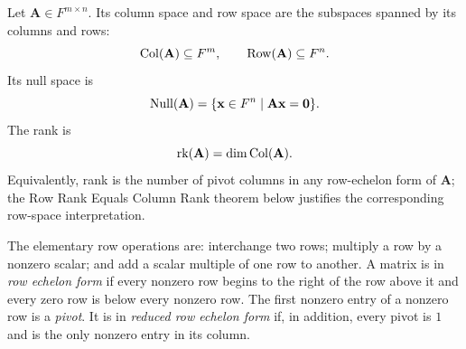     \begin{definition}
        Let $\mathbf{A}\in F^{m\times n}$. Its column space and row space are
        the subspaces spanned by its columns and rows:
        \[
            \operatorname{Col}(\mathbf{A})\subseteq F^m,
            \qquad
            \operatorname{Row}(\mathbf{A})\subseteq F^n.
        \]
        Its null space is
        \[
            \operatorname{Null}(\mathbf{A})
            =
            \{\mathbf{x}\in F^n\mid \mathbf{A}\mathbf{x}=\mathbf{0}\}.
        \]
        The rank is
        \[
            \operatorname{rk}(\mathbf{A})=\dim\operatorname{Col}(\mathbf{A}).
        \]
        Equivalently, rank is the number of pivot columns in any row-echelon
        form of $\mathbf{A}$; the Row Rank Equals Column Rank theorem below
        justifies the corresponding row-space interpretation.
    \end{definition}

    \begin{definition}
        The elementary row operations are: interchange two rows; multiply a row
        by a nonzero scalar; and add a scalar multiple of one row to another.
        A matrix is in \emph{row echelon form} if every nonzero row begins to the
        right of the row above it and every zero row is below every nonzero row.
        The first nonzero entry of a nonzero row is a \emph{pivot}. It is in
        \emph{reduced row echelon form} if, in addition, every pivot is $1$ and
        is the only nonzero entry in its column.
    \end{definition}

